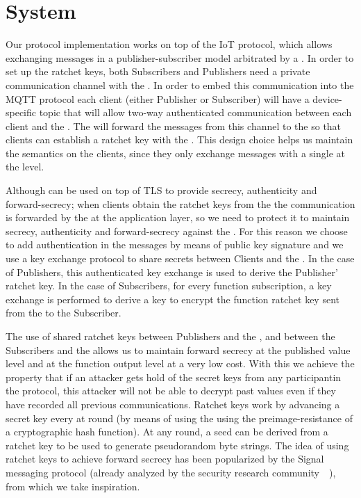 \section{System}
\label{sec:system}

Our protocol implementation works on top of the IoT \MQTT{} protocol, which
allows exchanging messages in a publisher-subscriber model arbitrated by a
\broker.  In order to set up the ratchet keys, both Subscribers and Publishers
need a private communication channel with the \garbler.  In order to embed
this communication into the MQTT protocol each client (either Publisher or
Subscriber) will have a device-specific topic that will allow two-way
authenticated communication between each client and the \broker.  The \broker
will forward the messages from this channel to the \garbler so that clients
can establish a ratchet key with the \garbler.  This design choice helps us
maintain the \MQTT{} semantics on the clients, since they only exchange
messages with a single \broker at the \MQTT{} level.

Although \MQTT{} can be used on top of TLS to provide secrecy, authenticity and
forward-secrecy; when clients obtain the ratchet keys from the \garbler
the communication is forwarded by the \broker at the application layer, so we
need to protect it to maintain secrecy, authenticity and forward-secrecy
against the \broker.  For this reason we choose to add authentication in the
\MQTT{} messages by means of public key signature and we use a key exchange
protocol to share secrets between Clients and the \garbler.  In the case of
Publishers, this authenticated key exchange is used to derive the Publisher'
ratchet key.  In the case of Subscribers, for every function subscription, a
key exchange is performed to derive a key to encrypt the function ratchet key
sent from the \garbler to the Subscriber.

The use of shared ratchet keys between Publishers and the \garbler, and between
the Subscribers and the \garbler allows us to maintain forward secrecy at the
published value level and at the function output level at a very low cost.
With this we achieve the property that if an attacker gets hold of the secret
keys from any participantin the protocol, this attacker will not be able to
decrypt past values even if they have recorded all previous communications.
Ratchet keys work by advancing a secret key every at round (by means of using
the using the preimage-resistance of a cryptographic hash function).  At any
round, a seed can be derived from a ratchet key to be used to generate
pseudorandom byte strings.  The idea of using ratchet keys to achieve forward
secrecy has been popularized by the Signal messaging protocol (already analyzed
by the security research community~\cite{signal1}~\cite{signal2}), from which
we take inspiration.

